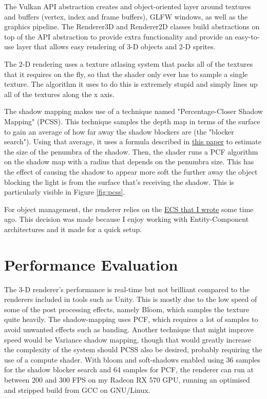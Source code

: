 \documentclass[8pt]{article}
\begin{document}
\begin{multicols}{2}
			The Vulkan API abstraction creates and object-oriented layer around
			textures and buffers (vertex, index and frame buffers), GLFW
			windows, as well as the graphics pipeline. The Renderer3D and
			Renderer2D classes build abstractions on top of the API abstraction
			to provide extra functionality and provide an easy-to-use layer
			that allows easy rendering of 3-D objects and 2-D sprites.

			The 2-D rendering uses a texture atlasing system that packs all of
			the textures that it requires on the fly, so that the shader only
			ever has to sample a single texture. The algorithm it uses to do
			this is extremely stupid and simply lines up all of the textures
			along the x axis.

			The shadow mapping makes use of a technique named
			"Percentage-Closer Shadow Mapping" (PCSS). This technique samples
			the depth map in terms of the surface to gain an average of how far
			away the shadow blockers are (the "blocker search"). Using that
			average, it uses a formula described in
			\href{https://developer.download.nvidia.com/shaderlibrary/docs/shadow_PCSS.pdf}{this
			paper} to estimate the size of the penumbra of the shadow. Then,
			the shader runs a PCF algorithm on the shadow map with a radius
			that depends on the penumbra size. This has the effect of causing
			the shadow to appear more soft the further away the object blocking
			the light is from the surface that's receiving the shadow. This is
			particularly visible in Figure \ref{fig:pcss}.

			For object management, the renderer relies on the
			\href{https://github.com/quou/ecs}{ECS that I wrote} some time ago.
			This decision was made because I enjoy working with Entity-Component
			architectures and it made for a quick setup.

			\section{Performance Evaluation}
			The 3-D renderer's performance is real-time but not brilliant
			compared to the renderers included in tools such as Unity. This is
			mostly due to the low speed of some of the post processing effects,
			namely Bloom, which samples the texture quite heavily. The
			shadow-mapping uses PCF, which requires a lot of samples to avoid
			unwanted effects such as banding. Another technique that might
			improve speed would be Variance shadow mapping, though that would
			greatly increase the complexity of the system should PCSS also be
			desired, probably requiring the use of a compute shader. With bloom
			and soft-shadows enabled using 36 samples for the shadow blocker
			search and 64 samples for PCF, the renderer can run at between 200
			and 300 FPS on my Radeon RX 570 GPU, running an optimised and stripped
			build from GCC on GNU/Linux.


\end{multicols}
\end{document}
